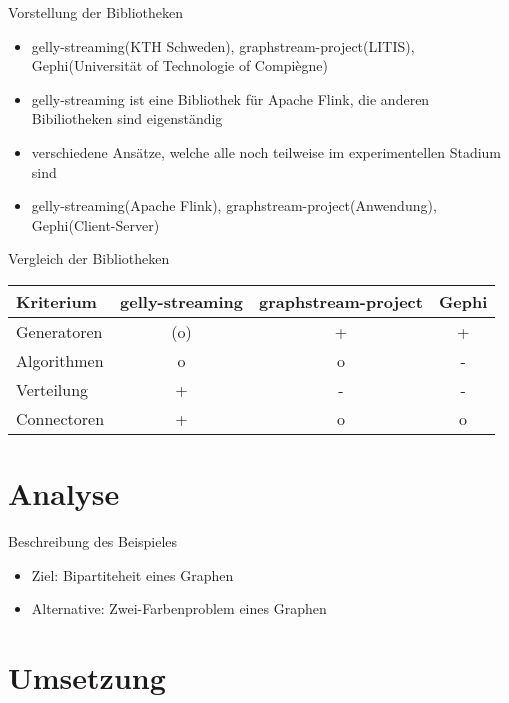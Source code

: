 \documentclass[a4paper, fontsize=11pt]{beamer}
\begin{document}
\begin{frame}{Vorstellung der Bibliotheken}
    \begin{itemize}
        \item gelly-streaming(KTH Schweden), graphstream-project(LITIS),
            Gephi(Universität of Technologie of Compiègne)
        \item gelly-streaming ist eine Bibliothek für Apache Flink, die anderen
            Bibiliotheken sind eigenständig
        \item verschiedene Ansätze, welche alle noch teilweise im experimentellen
            Stadium sind
        \item gelly-streaming(Apache Flink), graphstream-project(Anwendung),
            Gephi(Client-Server)
    \end{itemize}
\end{frame}

\begin{frame}{Vergleich der Bibliotheken}
    \begin{table}
        \begin{tabular}{l|c|c|c}
            Kriterium & gelly-streaming & graphstream-project & Gephi \\
            \hline
            Generatoren & (o) & + & + \\
            Algorithmen & o & o & - \\
            Verteilung & + & - & - \\
            Connectoren & + & o & o \\
        \end{tabular}
    \end{table}
\end{frame}

\section{Analyse}
\begin{frame}{Beschreibung des Beispieles}
    \begin{itemize}
        \item Ziel: Bipartiteheit eines Graphen
        \item Alternative: Zwei-Farbenproblem eines Graphen 
    \end{itemize}
\end{frame}

\section{Umsetzung}
\end{document}
